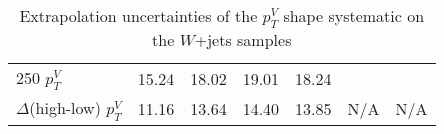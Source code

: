 \begin{table}[!htb]
\begin{tabular}{lS[table-format=3.2]S[table-format=3.2]S[table-format=3.2]S[table-format=3.2]S[table-format=3.2]S[table-format=3.2]}
    250 $p_T^V$                  & 15.24 & 18.02 & 19.01 & 18.24 &               &              \\
    $\Delta$(high-low) $p_T^V$   & 11.16 & 13.64 & 14.40 & 13.85 &     N/A          &      N/A  \\
    \bottomrule
  \end{tabular}
  \caption{Extrapolation uncertainties of the $p_T^V$ shape systematic on the
    $W$+jets samples}
\label{tab:wjets-extrapolation_uncertainties_pTV}
\end{table}